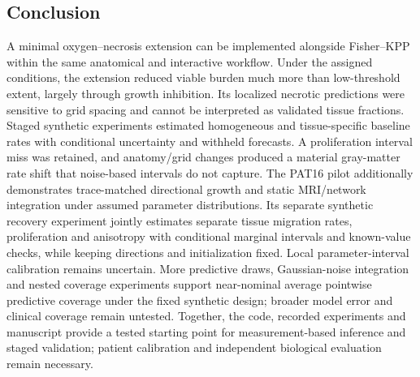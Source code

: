\subsection{Conclusion}
A minimal oxygen--necrosis extension can be implemented alongside Fisher--KPP within the same anatomical and interactive workflow. Under the assigned conditions, the extension reduced viable burden much more than low-threshold extent, largely through growth inhibition. Its localized necrotic predictions were sensitive to grid spacing and cannot be interpreted as validated tissue fractions. Staged synthetic experiments estimated homogeneous and tissue-specific baseline rates with conditional uncertainty and withheld forecasts. A proliferation interval miss was retained, and anatomy/grid changes produced a material gray-matter rate shift that noise-based intervals do not capture. The PAT16 pilot additionally demonstrates trace-matched directional growth and static MRI/network integration under assumed parameter distributions. Its separate synthetic recovery experiment jointly estimates separate tissue migration rates, proliferation and anisotropy with conditional marginal intervals and known-value checks, while keeping directions and initialization fixed. Local parameter-interval calibration remains uncertain. More predictive draws, Gaussian-noise integration and \PPTrials{} nested coverage experiments support near-nominal average pointwise predictive coverage under the fixed synthetic design; broader model error and clinical coverage remain untested. Together, the code, recorded experiments and manuscript provide a tested starting point for measurement-based inference and staged validation; patient calibration and independent biological evaluation remain necessary.

